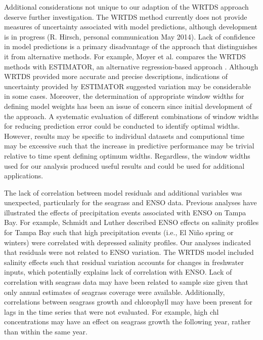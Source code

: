\documentclass{svjour3}\usepackage[]{graphicx}\usepackage[]{color}
\begin{document}
Additional considerations not unique to our adaption of the \ac{WRTDS} approach deserve further investigation.  The \ac{WRTDS} method currently does not provide measures of uncertainty associated with model predictions, although development is in progress (R. Hirsch, personal communication May 2014). Lack of confidence in model predictions is a primary disadvantage of the approach that distinguishes it from alternative methods.  For example, Moyer et al. \cite{Moyer12} compares the \ac{WRTDS} methods with ESTIMATOR, an alternative regression-based approach \cite{Cohn92}.  Although \ac{WRTDS} provided more accurate and precise descriptions, indications of uncertainty provided by ESTIMATOR suggested variation may be considerable in some cases.  Moreover, the determination of appropriate window widths for defining model weights has been an issue of concern since initial development of the approach.  A systematic evaluation of different combinations of window widths for reducing prediction error could be conducted to identify optimal widths.  However, results may be specific to individual datasets and computional time may be excessive such that the increase in predictive performance may be trivial relative to time spent defining optimum widths.  Regardless, the window widths used for our analysis produced useful results and could be used for additional applications.

The lack of correlation between model residuals and additional variables was unexpected, particularly for the seagrass and \ac{ENSO} data.  Previous analyses have illustrated the effects of precipitation events associated with \ac{ENSO} on Tampa Bay.  For example, Schmidt and Luther \cite{Schmidt02} described \ac{ENSO} effects on salinity profiles for Tampa Bay such that high precipitation events (i.e., El Ni\~{n}o spring or winters) were correlated with depressed salinity profiles.  Our analyses indicated that residuals were not related to \ac{ENSO} variation.  The \ac{WRTDS} model included salinity effects such that residual variation accounts for changes in freshwater inputs, which potentially explains lack of correlation with \ac{ENSO}. Lack of correlation with seagrass data may have been related to sample size given that only annual estimates of seagrass coverage were available.  Additionally, correlations between seagrass growth and chlorophyll may have been present for lags in the time series that were not evaluated.  For example, high \ac{chl} concentrations may have an effect on seagrass growth the following year, rather than within the same year.
\end{document}
